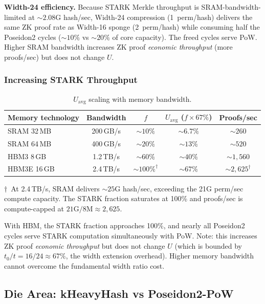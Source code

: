 \documentclass[11pt,a4paper]{article}
\begin{document}
\textbf{Width-24 efficiency.} Because STARK Merkle throughput is SRAM-bandwidth-limited at ${\sim}2.08$G hash/sec, Width-24 compression (1~perm/hash) delivers the same ZK proof rate as Width-16 sponge (2~perm/hash) while consuming half the Poseidon2 cycles (${\sim}10\%$ vs ${\sim}20\%$ of core capacity). The freed cycles serve PoW. Higher SRAM bandwidth increases ZK proof \emph{economic throughput} (more proofs/sec) but does not change $U$.

\subsubsection{Increasing STARK Throughput}
\label{sec:sram-scaling}

\begin{table}[h]
\centering
\begin{tabular}{@{}lcccc@{}}
\toprule
Memory technology & Bandwidth & $f$ & $U_{\mathrm{avg}}$ ($f \times 67\%$) & Proofs/sec \\
\midrule
SRAM 32\,MB & 200\,GB/s & ${\sim}10\%$ & ${\sim}6.7\%$ & ${\sim}260$ \\
SRAM 64\,MB & 400\,GB/s & ${\sim}20\%$ & ${\sim}13\%$ & ${\sim}520$ \\
HBM3 8\,GB & 1.2\,TB/s & ${\sim}60\%$ & ${\sim}40\%$ & ${\sim}1{,}560$ \\
HBM3E 16\,GB & 2.4\,TB/s & ${\sim}100\%^{\dagger}$ & ${\sim}67\%$ & ${\sim}2{,}625^{\dagger}$ \\
\bottomrule
\end{tabular}
\caption{$U_{\mathrm{avg}}$ scaling with memory bandwidth.}
\label{tab:memory-scaling}
\end{table}

$\dagger$~At 2.4\,TB/s, SRAM delivers ${\sim}25$G hash/sec, exceeding the 21G perm/sec compute capacity. The STARK fraction saturates at 100\% and proofs/sec is compute-capped at $21\text{G}/8\text{M} \approx 2{,}625$.

With HBM, the STARK fraction approaches 100\%, and nearly all Poseidon2 cycles serve STARK computation simultaneously with PoW. Note: this increases ZK proof \emph{economic throughput} but does not change $U$ (which is bounded by $t_0/t = 16/24 \approx 67\%$, the width extension overhead). Higher memory bandwidth cannot overcome the fundamental width ratio cost.

\subsection{Die Area: kHeavyHash vs Poseidon2-PoW}
\end{document}
